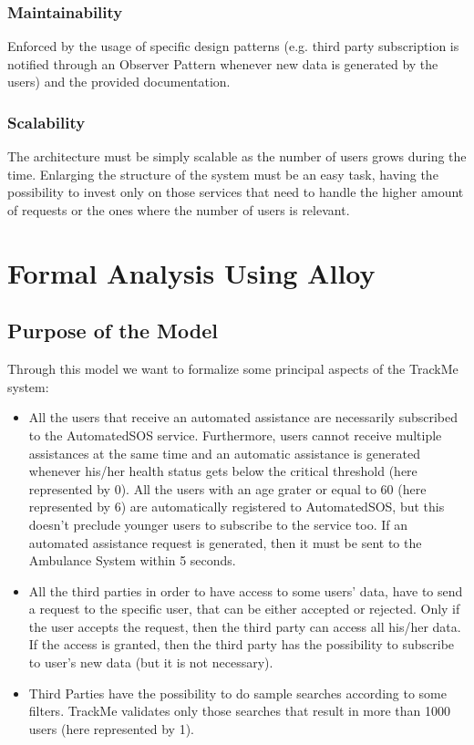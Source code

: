 \documentclass[12pt,a4paper]{article}
\begin{document}
		\subsubsection{Maintainability}
		Enforced by the usage of specific design patterns (e.g. third party subscription is notified through an Observer Pattern whenever new data is generated by the users) and the provided documentation.
		\subsubsection{Scalability}
		The architecture must be simply scalable as the number of users grows during the time.
		 Enlarging the structure of the system must be an easy task, having the possibility to invest only on those services that need to handle the higher amount of requests or the ones where the number of users is relevant.


	\newpage
	\section{Formal Analysis Using Alloy}
		\subsection{Purpose of the Model}
			Through this model we want to formalize some principal aspects of the TrackMe system:
			\begin{itemize}
				\item All the users that receive an automated assistance are necessarily subscribed to the AutomatedSOS service. 
				Furthermore, users cannot receive multiple assistances at the same time and an automatic assistance is generated 
				whenever his/her health status gets below the critical threshold (here represented by 0). All the users with an age grater or equal to 60 (here represented by 6) are automatically registered to AutomatedSOS, but this doesn't preclude younger users to subscribe to the service too. If an automated assistance request is generated, then it must be sent to the Ambulance System within 5 seconds.
				\item All the third parties in order to have access to some users' data, have to send a request to the specific user, that can be either accepted or rejected. Only if the user accepts the request, then the third party can access all his/her data. If the access is granted, then the third party has the possibility to subscribe to user's new data (but it is not necessary).
				\item Third Parties have the possibility to do sample searches according to some filters. TrackMe validates only those searches that result in more than 1000 users (here represented by 1). 
			\end{itemize}
\end{document}
